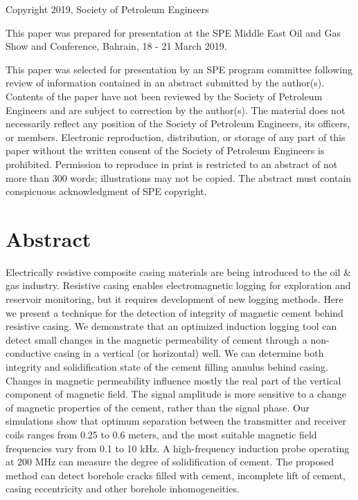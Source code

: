 \documentclass[10pt,twoside]{article}
\begin{document}
\noindent \parbox[t]{7.5in}{ \scriptsize \sffamily \noindent
Copyright 2019, Society of Petroleum Engineers

\medskip

\noindent This paper was prepared for presentation at the SPE Middle East Oil and Gas Show and Conference, Bahrain, 18 - 21 March 2019.

\medskip

\noindent This paper was selected for presentation by an SPE program committee following review of information contained in an abstract submitted by the author(s). Contents of the paper have not been reviewed by the Society of Petroleum Engineers and are subject to correction by the author(s). The material does not necessarily reflect any position of the Society of Petroleum Engineers, its officers, or members. Electronic reproduction, distribution, or storage of any part of this paper without the written consent of the Society of Petroleum Engineers is prohibited. Permission to reproduce in print is restricted to an abstract of not more than 300 words; illustrations may not be copied. The abstract must contain conspicuous acknowledgment of SPE copyright.

\noindent \hrulefill}

\section*{Abstract}
\label{Sec:Abstract}

{Electrically resistive composite casing materials are being introduced to the oil \& gas industry. Resistive casing enables electromagnetic logging for exploration and reservoir monitoring, but it requires development of new logging methods.} Here we present a technique for the detection of integrity of magnetic cement behind resistive casing. We demonstrate that an optimized induction logging tool can detect small changes in the magnetic permeability of cement through a non-conductive casing in a vertical (or horizontal) well. We can determine both integrity and solidification state of the cement filling annulus behind casing.  Changes in magnetic permeability influence mostly the real part of the vertical component of magnetic field. The signal amplitude is more sensitive to a change of magnetic properties of the cement, rather than the signal phase. Our simulations show that optimum separation between the transmitter and receiver coils ranges from 0.25 to 0.6 meters, and the most suitable magnetic field frequencies vary from 0.1 to 10 kHz. {A high-frequency induction probe operating at 200 MHz can measure the degree of solidification of cement.} The proposed method can detect borehole cracks filled with cement, incomplete lift of cement, casing eccentricity and other borehole inhomogeneities.
\end{document}
